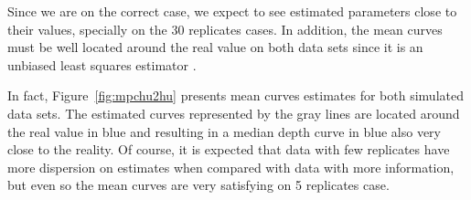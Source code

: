 Since we are on the correct case, we expect to see estimated parameters close to their values, specially on the 30 replicates cases. In addition, the mean curves must be well located around the real value on both data sets since it is an unbiased least squares estimator \cite{shi2011gaussian}.

\begin{knitrout}
\color{fgcolor}\begin{kframe}


{\ttfamily\noindent\bfseries{}}

{\ttfamily\noindent\bfseries{}}\end{kframe}
\end{knitrout}

In fact, Figure~\ref{fig:mpchu2hu} presents mean curves estimates for both simulated data sets. The estimated curves represented by the gray lines are located around the real value in blue and resulting in a median depth curve in blue also very close to the reality. Of course, it is expected that data with few replicates have more dispersion on estimates when compared with data with more information, but even so the mean curves are very satisfying on 5 replicates case.


